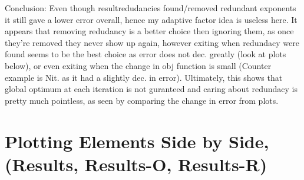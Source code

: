 \documentclass[]{article}
\begin{document}
Conclusion: Even though result\textunderscore redudancies found/removed redundant exponents it still gave a lower error overall, hence my adaptive factor idea is useless here. It appears that removing redudancy is a better choice then ignoring them, as once they're removed they never show up again, however exiting when redundacy were found seems to be the best choice as error does not dec. greatly (look at plots below), or even exiting when the change in obj function is small (Counter example is Nit. as it had a slightly dec. in error). Ultimately, this shows that global optimum at each iteration is not guranteed and caring about redundacy is pretty much pointless, as seen by comparing the change in error from plots. 


\section{Plotting Elements Side by Side, (Results, Results-O, Results-R)}
\end{document}
